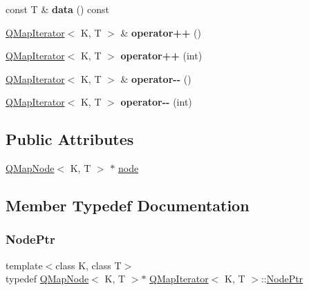\begin{DoxyCompactItemize}
const T \& {\bfseries data} () const
\item 
\mbox{\label{class_q_map_iterator_a1914ea33f77a3a2217ec5ceb171ea680}} 
\mbox{\hyperlink{class_q_map_iterator}{Q\+Map\+Iterator}}$<$ K, T $>$ \& {\bfseries operator++} ()
\item 
\mbox{\label{class_q_map_iterator_a26dfff9498e136be9013686ce84e87be}} 
\mbox{\hyperlink{class_q_map_iterator}{Q\+Map\+Iterator}}$<$ K, T $>$ {\bfseries operator++} (int)
\item 
\mbox{\label{class_q_map_iterator_a3e9d04da406d2daa9163c76a001de6b6}} 
\mbox{\hyperlink{class_q_map_iterator}{Q\+Map\+Iterator}}$<$ K, T $>$ \& {\bfseries operator-\/-\/} ()
\item 
\mbox{\label{class_q_map_iterator_aeaf069ac8a6f38d9732ec4adf69f4c0f}} 
\mbox{\hyperlink{class_q_map_iterator}{Q\+Map\+Iterator}}$<$ K, T $>$ {\bfseries operator-\/-\/} (int)
\end{DoxyCompactItemize}
\subsection*{Public Attributes}
\begin{DoxyCompactItemize}
\item 
\mbox{\hyperlink{struct_q_map_node}{Q\+Map\+Node}}$<$ K, T $>$ $\ast$ \mbox{\hyperlink{class_q_map_iterator_a3b2c813b9d957d55ba6bf87f460e0e1e}{node}}
\end{DoxyCompactItemize}


\subsection{Member Typedef Documentation}
\mbox{\label{class_q_map_iterator_a5c98753ea9eaa24ef743577602acb90b}} 
\subsubsection{\texorpdfstring{NodePtr}{NodePtr}}
{\footnotesize\ttfamily template$<$class K, class T$>$ \\
typedef \mbox{\hyperlink{struct_q_map_node}{Q\+Map\+Node}}$<$ K, T $>$$\ast$ \mbox{\hyperlink{class_q_map_iterator}{Q\+Map\+Iterator}}$<$ K, T $>$\+::\mbox{\hyperlink{class_q_map_iterator_a5c98753ea9eaa24ef743577602acb90b}{Node\+Ptr}}}

